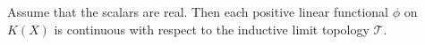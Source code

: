 Assume that the scalars are real. Then each positive linear functional $\phi$ on $K(X)$ is continuous with respect to the inductive limit topology $\mathcal{T}$.
